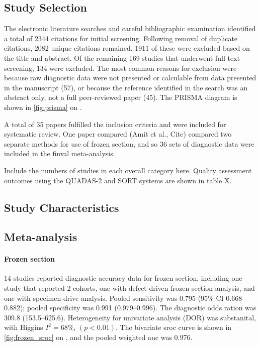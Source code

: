 \subsection{Study Selection}

The electronic literature searches and careful bibliographic examination identified a total of 2344 citations for initial screening.
Following removal of duplicate citations, 2082 unique citations remained.
1911 of these were excluded based on the title and abstract.
Of the remaining 169 studies that underwent full text screening, 134 were excluded.
The most common reasons for exclusion were because raw diagnostic data were not presented or calculable from data presented in the manuscript (57), or because the reference identified in the search was an abstract only, not a full peer-reviewed paper (45).
The PRISMA diagram is shown in \cref{fig:prisma} on .

A total of 35 papers fulfilled the inclusion criteria and were included for systematic review.
One paper compared (Amit et al., Cite) compared two separate methods for use of frozen section, and so 36 sets of diagnostic data were included in the finval meta-analysis.

Include the numbers of studies in each overall category here.
Quality assessment outcomes using the QUADAS-2 and SORT systems are shown in table X.




\subsection{Study Characteristics}

\subsection{Meta-analysis}

\paragraph{Frozen section}

14 studies reported diagnostic accuracy data for frozen section, including one study \cite{amitImprovingRateNegative2016} that reported 2 cohorts, one with defect driven frozen section analysis, and one with specimen-drive analysis.
Pooled sensitivity was 0.795 (95\% CI 0.668--0.882); pooled specificity was 0.991 (0.979--0.996).
The diagnostic odds ration was 309.8 (153.5--625.6).
Heterogeneity for univariate analysis (DOR) was substanital, with Higgins $I^2 = 68\%$, $(p<0.01)$.
The bivariate \gls{sroc} curve is shown in \cref{fig:frozen_sroc} on , and the pooled weighted \gls{auc} was 0.976. 

